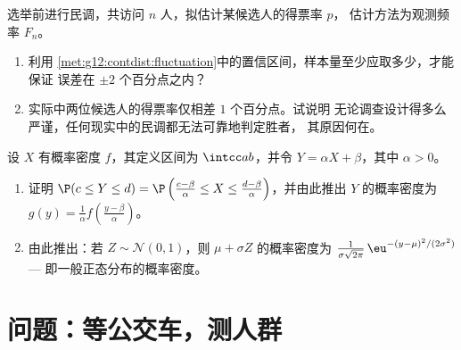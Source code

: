 \begin{exercise}[$\star\star\star$]\label{exo:g12:contdist:8}
选举前进行民调，共访问 $n$ 人，拟估计某候选人的得票率 $p$，
估计方法为观测频率 $F_n$。
\begin{enumerate}
  \item 利用
        \cref{met:g12:contdist:fluctuation}中的置信区间，样本量至少应取多少，才能保证
        误差在 $\pm 2$ 个百分点之内？
  \item 实际中两位候选人的得票率仅相差 $1$ 个百分点。试说明
        无论调查设计得多么严谨，任何现实中的民调都无法可靠地判定胜者，
        其原因何在。
\end{enumerate}
\end{exercise}

\begin{exercise}[$\star\star\star$]\label{exo:g12:contdist:9}
设 $X$ 有概率密度 $f$，其定义区间为 $\intcc ab$，并令
$Y = \alpha X + \beta$，其中 $\alpha > 0$。
\begin{enumerate}
  \item 证明 $\P(c \leq Y \leq d)
        = \P\left(\frac{c - \beta}{\alpha} \leq X \leq
        \frac{d-\beta}{\alpha}\right)$，并由此推出 $Y$ 的概率密度为
        $g(y) = \frac{1}{\alpha} f\left(\frac{y - \beta}{\alpha}\right)$。
  \item 由此推出：若 $Z \sim \mathcal N(0,1)$，则
        $\mu + \sigma Z$ 的概率密度为
        $\frac{1}{\sigma\sqrt{2\pi}}\,
        \eu^{-(y - \mu)^2/(2\sigma^2)}$ --- 即一般正态分布的概率密度。
\end{enumerate}
\end{exercise}

\section{问题：等公交车，测人群}

